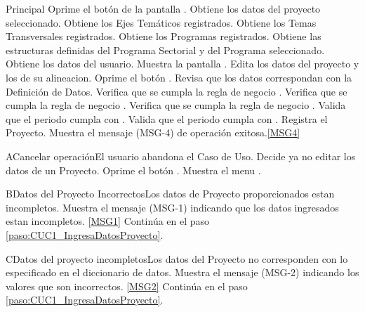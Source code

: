 	\begin{UCtrayectoria}{Principal}
			\UCpaso[\UCactor] Oprime el botón  de la pantalla .
			\UCpaso Obtiene los datos del proyecto seleccionado.
			\UCpaso Obtiene los Ejes Temáticos registrados.
			\UCpaso Obtiene los Temas Transversales registrados.
			\UCpaso Obtiene los Programas registrados.
			\UCpaso Obtiene las estructuras definidas del Programa Sectorial y del Programa seleccionado.
			\UCpaso Obtiene los datos del usuario.
			\UCpaso Muestra la pantalla .
			\UCpaso [\UCactor] Edita los datos del proyecto y los de su alineacion.\label{paso:CUC1_IngresaDatosProyecto} 
			\UCpaso [\UCactor] Oprime el botón .\label{paso:CUC1_OprimeAceptar}
			\UCpaso Revisa que los datos correspondan con la Definición de Datos.  
			\UCpaso Verifica que se cumpla la regla de negocio .
			\UCpaso Verifica que se cumpla la regla de negocio .
			\UCpaso Verifica que se cumpla la regla de negocio .
			\UCpaso Valida que el periodo cumpla con   .
			\UCpaso Valida que el periodo cumpla con   .
			\UCpaso Registra el Proyecto.
			\UCpaso Muestra el mensaje (MSG-4) de operación exitosa.\ref{MSG4}
	\end{UCtrayectoria}

	\begin{UCtrayectoriaA}{A}{Cancelar operación}{El usuario abandona el Caso de Uso.}
			\UCpaso[\UCactor] Decide ya no editar los datos de un Proyecto.
			\UCpaso[\UCactor] Oprime el botón .
			\UCpaso Muestra el menu .
	\end{UCtrayectoriaA}


	\begin{UCtrayectoriaA}{B}{Datos del Proyecto Incorrectos}{Los datos de Proyecto proporcionados estan incompletos.}
			\UCpaso Muestra el mensaje (MSG-1) indicando que los datos ingresados estan incompletos. \ref{MSG1}
			\UCpaso Continúa en el paso \ref{paso:CUC1_IngresaDatosProyecto}.
	\end{UCtrayectoriaA}

	\begin{UCtrayectoriaA}{C}{Datos del proyecto incompletos}{Los datos del Proyecto no corresponden con lo especificado en el diccionario de datos.}
			\UCpaso Muestra el mensaje (MSG-2) indicando los valores que son incorrectos. \ref{MSG2}
			\UCpaso Continúa en el paso \ref{paso:CUC1_IngresaDatosProyecto}.
	\end{UCtrayectoriaA}

